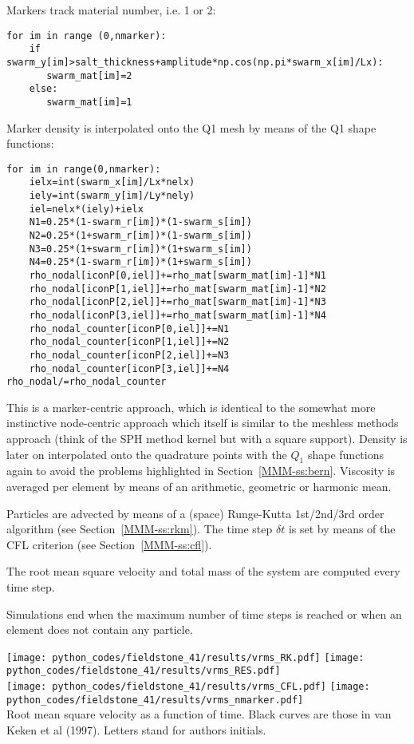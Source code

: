 Markers track material number, i.e. 1 or 2:
\begin{lstlisting}
for im in range (0,nmarker):
    if swarm_y[im]>salt_thickness+amplitude*np.cos(np.pi*swarm_x[im]/Lx):
       swarm_mat[im]=2
    else:
       swarm_mat[im]=1
\end{lstlisting}

Marker density is interpolated onto the Q1 mesh by means of the Q1 shape functions:
\begin{lstlisting}
for im in range(0,nmarker):
    ielx=int(swarm_x[im]/Lx*nelx)
    iely=int(swarm_y[im]/Ly*nely)
    iel=nelx*(iely)+ielx
    N1=0.25*(1-swarm_r[im])*(1-swarm_s[im])
    N2=0.25*(1+swarm_r[im])*(1-swarm_s[im])
    N3=0.25*(1+swarm_r[im])*(1+swarm_s[im])
    N4=0.25*(1-swarm_r[im])*(1+swarm_s[im])
    rho_nodal[iconP[0,iel]]+=rho_mat[swarm_mat[im]-1]*N1
    rho_nodal[iconP[1,iel]]+=rho_mat[swarm_mat[im]-1]*N2
    rho_nodal[iconP[2,iel]]+=rho_mat[swarm_mat[im]-1]*N3
    rho_nodal[iconP[3,iel]]+=rho_mat[swarm_mat[im]-1]*N4
    rho_nodal_counter[iconP[0,iel]]+=N1
    rho_nodal_counter[iconP[1,iel]]+=N2
    rho_nodal_counter[iconP[2,iel]]+=N3
    rho_nodal_counter[iconP[3,iel]]+=N4
rho_nodal/=rho_nodal_counter
\end{lstlisting}
This is a marker-centric approach, which is identical to the 
somewhat more instinctive node-centric approach which itself is similar
to the meshless methods approach (think of the SPH method kernel but with a 
square support). Density is later on interpolated onto the quadrature points 
with the $Q_1$ shape functions again to avoid the problems highlighted in 
Section~\ref{MMM-ss:bern}.
Viscosity is averaged per element by means of an arithmetic, geometric or harmonic mean.

Particles are advected by means of a (space) Runge-Kutta 1st/2nd/3rd order algorithm (see
Section~\ref{MMM-ss:rkm}). The time step $\delta t$ is set by means of the CFL criterion (see
Section~\ref{MMM-ss:cfl}).

The root mean square velocity and total mass of the system are computed every time step.

Simulations end when the maximum number of time steps is reached or when 
an element does not contain any particle.
\begin{center}
\texttt{[image: python\_codes/fieldstone\_41/results/vrms\_RK.pdf]}
\texttt{[image: python\_codes/fieldstone\_41/results/vrms\_RES.pdf]}\\
\texttt{[image: python\_codes/fieldstone\_41/results/vrms\_CFL.pdf]}
\texttt{[image: python\_codes/fieldstone\_41/results/vrms\_nmarker.pdf]}\\
{\captionfont Root mean square velocity as a function of time. Black curves are those in van Keken
et al (1997). Letters stand for authors initials.}
\end{center}



